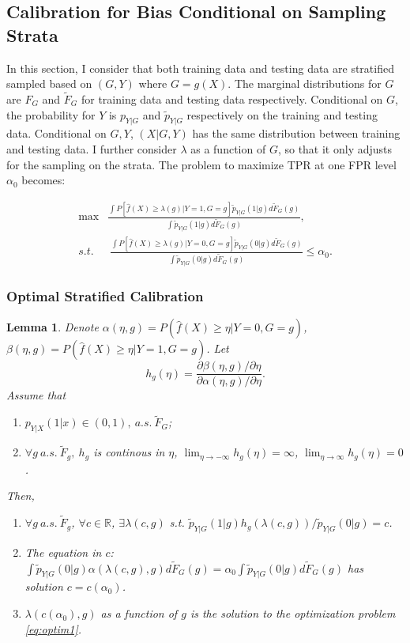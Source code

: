 \documentclass{article} %
\newtheorem{lemma}[theorem]{Lemma}
\begin{document}
\subsection{Calibration for Bias Conditional on Sampling Strata}

In this section, I consider that both training data and testing data are stratified sampled based on $(G,Y)$ where $G=g(X)$. The marginal distributions for $G$ are $F_G$ and $\tilde F_G$ for training data and testing data respectively. Conditional on $G$, the probability for $Y$ is $p_{Y|G}$ and $\tilde p_{Y|G}$ respectively on the training and testing data. Conditional on $G,Y$, $(X|G,Y)$ has the same distribution between training and testing data. I further consider $\lambda$ as a function of $G$, so that it only adjusts for the sampling on the strata. The problem to maximize TPR at one FPR level $\alpha_0$ becomes:

\begin{equation}\label{eq:optim1}
\begin{split}
\max & \frac{\int P[\hat f(X) \geq \lambda(g)|Y=1,G=g]\tilde p_{Y|G}(1|g)d\tilde F_G(g)}{\int \tilde p_{Y|G}(1|g)d\tilde F_G(g)},\\
s.t.& ~\frac{\int P[\hat f(X) \geq \lambda(g)|Y=0,G=g] \tilde p_{Y|G}(0|g) d\tilde F_G(g)}{\int \tilde p_{Y|G}(0|g)d\tilde F_G(g)}\leq \alpha_0.
\end{split}
\end{equation}

\subsubsection{Optimal Stratified Calibration}

\begin{lemma}\label{lm:condrank}
Denote $\alpha(\eta, g)=P(\hat f(X)\geq \eta|Y=0,G=g)$, $\beta(\eta, g)=P(\hat f(X)\geq \eta|Y=1,G=g)$. Let
\[
h_g(\eta)=\frac{\partial\beta(\eta,g)/\partial\eta}{\partial\alpha(\eta,g)/\partial\eta}.
\]
Assume that
\begin{enumerate}
\item $p_{Y|X}(1|x)\in (0,1),~a.s. ~\tilde F_G$;
\item $\forall g~a.s.~\tilde F_g,~h_g$ is continous in $\eta$, $\lim_{\eta\rightarrow -\infty}h_g(\eta)=\infty$, $\lim_{\eta\rightarrow \infty}h_g(\eta)=0$.
\end{enumerate}
Then, 
\begin{enumerate}
\item $\forall g~a.s.~\tilde F_g$, $\forall c\in \mathbb R$, $\exists \lambda(c,g)$ s.t. $\tilde p_{Y|G}(1|g)h_g(\lambda(c,g))/\tilde p_{Y|G}(0|g)=c$.
\item The equation in $c$: $\int \tilde p_{Y|G}(0|g)\alpha(\lambda(c,g),g)d\tilde F_G(g)=\alpha_0\int \tilde p_{Y|G}(0|g)d\tilde F_G(g)$ has solution $c=c(\alpha_0)$.
\item $\lambda(c(\alpha_0),g)$ as a function of $g$ is the solution to the optimization problem \ref{eq:optim1}.
\end{enumerate}
\end{lemma}
\end{document}
